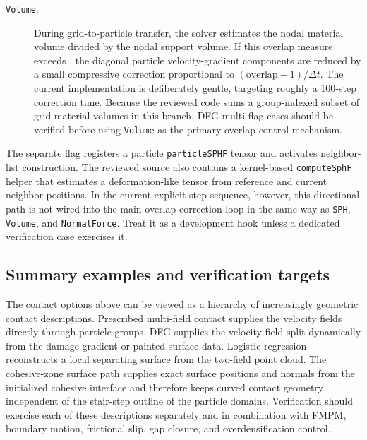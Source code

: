 \begin{description}
  \item[\texttt{Volume}.] During grid-to-particle transfer, the solver estimates the nodal material volume divided by the nodal support volume.  If this overlap measure exceeds , the diagonal particle velocity-gradient components are reduced by a small compressive correction proportional to $(\mathrm{overlap}-1)/\Delta t$.  The current implementation is deliberately gentle, targeting roughly a 100-step correction time.  Because the reviewed code sums a group-indexed subset of grid material volumes in this branch, DFG multi-flag cases should be verified before using \texttt{Volume} as the primary overlap-control mechanism.
\end{description}

The separate flag  registers a particle \texttt{particleSPHF} tensor and activates neighbor-list construction.  The reviewed source also contains a kernel-based \texttt{computeSphF} helper that estimates a deformation-like tensor from reference and current neighbor positions.  In the current explicit-step sequence, however, this directional path is not wired into the main overlap-correction loop in the same way as \texttt{SPH}, \texttt{Volume}, and \texttt{NormalForce}.  Treat it as a development hook unless a dedicated verification case exercises it.


\subsection{Summary examples and verification targets}
\label{subsec:contact-summary-examples}

The contact options above can be viewed as a hierarchy of increasingly geometric contact descriptions.  Prescribed multi-field contact supplies the velocity fields directly through particle groups.  DFG supplies the velocity-field split dynamically from the damage-gradient or painted surface data.  Logistic regression reconstructs a local separating surface from the two-field point cloud.  The cohesive-zone surface path supplies exact surface positions and normals from the initialized cohesive interface and therefore keeps curved contact geometry independent of the stair-step outline of the particle domains.  Verification should exercise each of these descriptions separately and in combination with FMPM, boundary motion, frictional slip, gap closure, and overdensification control.

